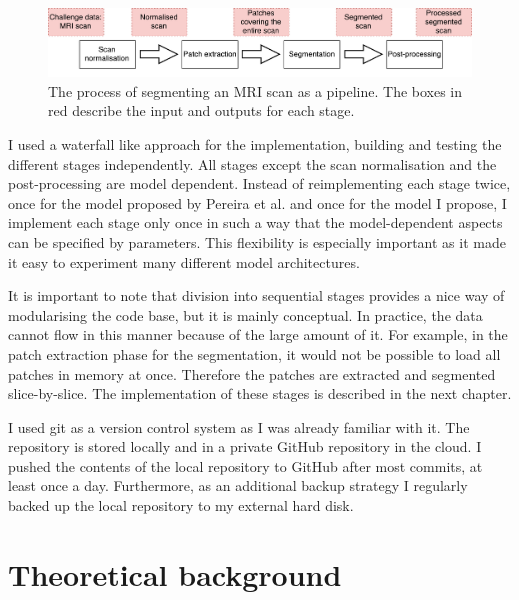 \documentclass[12pt,a4paper,twoside,openright]{report}
\begin{document}
\begin{figure}
	\centering
	\includegraphics[width=\textwidth]{segmentation_implementation_pipeline}
	\caption[The process of segmenting an MRI scan as a pipeline]{The process of segmenting an MRI scan as a pipeline. The boxes in red describe the input and outputs for each stage.}
	\label{fig:segmentation_implementation_pipeline}
\end{figure}

I used a waterfall like approach for the implementation, building and testing the different stages independently. All stages except the scan normalisation and the post-processing are model dependent. Instead of reimplementing each stage twice, once for the model proposed by Pereira et al. and once for the model I propose, I implement each stage only once in such a way that the model-dependent aspects can be specified by parameters. This flexibility is especially important as it made it easy to experiment many different model architectures.

It is important to note that division into sequential stages provides a nice way of modularising the code base, but it is mainly conceptual. In practice, the data cannot flow in this manner because of the large amount of it. For example, in the patch extraction phase for the segmentation, it would not be possible to load all patches in memory at once. Therefore the patches are extracted and segmented slice-by-slice. The implementation of these stages is described in the next chapter.

I used git as a version control system as I was already familiar with it. The repository is stored locally and in a private GitHub repository in the cloud. I pushed the contents of the local repository to GitHub after most commits, at least once a day. Furthermore, as an additional backup strategy I regularly backed up the local repository to my external hard disk.

\section{Theoretical background}
\end{document}
